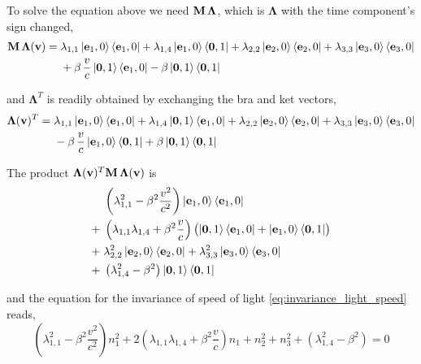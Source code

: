 \documentclass[12pt]{article}
\begin{document}
To solve the equation above we need $\vb{M}\,\boldsymbol{\Lambda}$, which is
$\boldsymbol{\Lambda}$ with the time component's sign changed,
\begin{equation}
  \begin{aligned}
    \vb{M}\,\boldsymbol{\Lambda}(\vb{v}) =\;
      &\lambda_{1,1}\ket{\vb{e}_1,0}\bra{\vb{e}_1,0}
      + \lambda_{1,4}\ket{\vb{e}_1,0}\bra{\vb{0},1}
      + \lambda_{2,2}\ket{\vb{e}_2,0}\bra{\vb{e}_2,0}
      + \lambda_{3,3}\ket{\vb{e}_3,0}\bra{\vb{e}_3,0} \\
      &+ \beta\,\frac{v}{c}\ket{\vb{0},1}\bra{\vb{e}_1,0}
      - \beta\ket{\vb{0},1}\bra{\vb{0},1}
  \end{aligned}
\end{equation}

and $\boldsymbol{\Lambda}^T$ is readily obtained by exchanging the bra and ket vectors,
\begin{equation}
  \begin{aligned}
    \boldsymbol{\Lambda}(\vb{v})^T =\;
      &\lambda_{1,1}\ket{\vb{e}_1,0}\bra{\vb{e}_1,0}
      + \lambda_{1,4}\ket{\vb{0},1}\bra{\vb{e}_1,0}
      + \lambda_{2,2}\ket{\vb{e}_2,0}\bra{\vb{e}_2,0}
      + \lambda_{3,3}\ket{\vb{e}_3,0}\bra{\vb{e}_3,0} \\
      &- \beta\,\frac{v}{c}\ket{\vb{e}_1,0}\bra{\vb{0},1}
      + \beta\ket{\vb{0},1}\bra{\vb{0},1}
  \end{aligned}
\end{equation}

The product $\boldsymbol{\Lambda}(\vb{v})^T\vb{M}\,\boldsymbol{\Lambda}(\vb{v})$ is
\begin{equation}
  \begin{aligned}
    &\left(\lambda_{1,1}^2 - \beta^2\frac{v^2}{c^2}\right)\ket{\vb{e}_1,0}\bra{\vb{e}_1,0} \\
    +\;&\left(\lambda_{1,1}\lambda_{1,4} + \beta^2\frac{v}{c}\right)
      \bigl(\ket{\vb{0},1}\bra{\vb{e}_1,0} + \ket{\vb{e}_1,0}\bra{\vb{0},1}\bigr) \\
    +\;&\lambda_{2,2}^2\ket{\vb{e}_2,0}\bra{\vb{e}_2,0}
      + \lambda_{3,3}^2\ket{\vb{e}_3,0}\bra{\vb{e}_3,0} \\
    +\;&\left(\lambda_{1,4}^2 - \beta^2\right)\ket{\vb{0},1}\bra{\vb{0},1}
  \end{aligned}
\end{equation}

and the equation for the invariance of speed of light \eqref{eq:invariance_light_speed} reads,
\begin{equation}
  \left(\lambda_{1,1}^2 - \beta^2\frac{v^2}{c^2}\right)n_1^2
  + 2\left(\lambda_{1,1}\lambda_{1,4} + \beta^2\frac{v}{c}\right)n_1
  + n_2^2 + n_3^2
  + \left(\lambda_{1,4}^2 - \beta^2\right) = 0
\end{equation}
\end{document}

